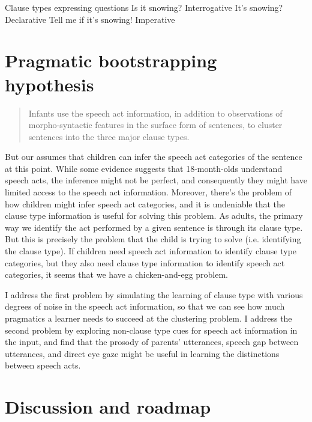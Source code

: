 Clause types expressing questions
\bxl
Is it snowing? \hfill Interrogative
\ex It's snowing? \hfill Declarative
\ex Tell me if it's snowing! \hfill Imperative
\exl
\eex


\section{Pragmatic bootstrapping hypothesis}

\begin{quote}
Infants use the speech act information, in addition to observations of morpho-syntactic features in the surface form of sentences, to cluster sentences into the three major clause types.
\end{quote}



But our \hypos{} assumes that children can infer the speech act categories of the sentence at this point. While some evidence suggests that 18-month-olds understand speech acts, the inference might not be perfect, and consequently they might have limited access to the speech act information. Moreover, there's the problem of how children might infer speech act categories, and it is undeniable that the clause type information is useful for solving this problem. As adults, the primary way we identify the act performed by a given sentence is through its clause type. But this is precisely the problem that the child is trying to solve (i.e. identifying the clause type). If children need speech act information to identify clause type categories, but they also need clause type information to identify speech act categories, it seems that we have a chicken-and-egg problem. 

I address the first problem by simulating the learning of clause type with various degrees of noise in the speech act information, so that we can see how much pragmatics a learner needs to succeed at the clustering problem. I address the second problem by exploring non-clause type cues for speech act information in the input, and find that the prosody of parents' utterances, speech gap between utterances, and direct eye gaze might be useful in learning the distinctions between speech acts.

\section{Discussion and roadmap}
\label{sec:intro:roadmap}

